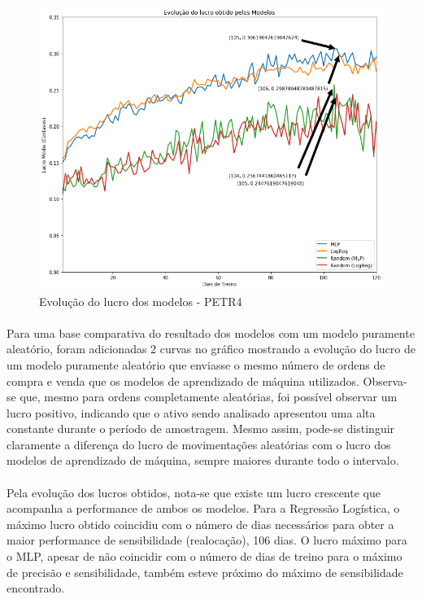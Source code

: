 \documentclass[grad,numbers]{coppe}
\begin{document}
            \begin{figure}[h!]
                \caption{Evolução do lucro dos modelos - PETR4}
                \label{img:lucro}
                \includegraphics[width=13.1cm]{lucro.png}
                \centering
            \end{figure}
            
            \paragraph{}Para uma base comparativa do resultado dos modelos com um modelo puramente aleatório, foram adicionadas 2 curvas no gráfico mostrando a evolução do lucro de um modelo puramente aleatório que enviasse o mesmo número de ordens de compra e venda que os modelos de aprendizado de máquina utilizados. Observa-se que, mesmo para ordens completamente aleatórias, foi possível observar um lucro positivo, indicando que o ativo sendo analisado apresentou uma alta constante durante o período de amostragem. Mesmo assim, pode-se distinguir claramente a diferença do lucro de movimentações aleatórias com o lucro dos modelos de aprendizado de máquina, sempre maiores durante todo o intervalo.
            
            \paragraph{}Pela evolução dos lucros obtidos, nota-se que existe um lucro crescente que acompanha a performance de ambos os modelos. Para a Regressão Logística, o máximo lucro obtido coincidiu com o número de dias necessários para obter a maior performance de sensibilidade (realocação), 106 dias. O lucro máximo para o MLP, apesar de não coincidir com o número de dias de treino para o máximo de precisão e sensibilidade, também esteve próximo do máximo de sensibilidade encontrado. 
            
\end{document}
